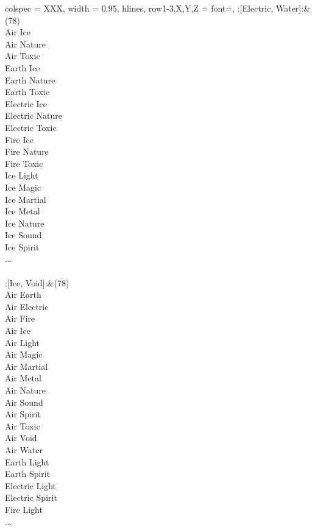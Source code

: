 \begin{longtblr}[
	caption = {2v2 Defending Weak},
	label = {2v2-Defending-Weak},
]{
	colspec = {XXX}, width = 0.95\linewidth,
	hlines,
	row{1-3,X,Y,Z} = {font=\bfseries},
}
	:[Electric, Water]:&{(78)\\
	Air Ice \\
	Air Nature \\
	Air Toxic \\
	Earth Ice \\
	Earth Nature \\
	Earth Toxic \\
	Electric Ice \\
	Electric Nature \\
	Electric Toxic \\
	Fire Ice \\
	Fire Nature \\
	Fire Toxic \\
	Ice Light \\
	Ice Magic \\
	Ice Martial \\
	Ice Metal \\
	Ice Nature \\
	Ice Sound \\
	Ice Spirit \\
	...\\
	}\\

	:[Ice, Void]:&{(78)\\
	Air Earth \\
	Air Electric \\
	Air Fire \\
	Air Ice \\
	Air Light \\
	Air Magic \\
	Air Martial \\
	Air Metal \\
	Air Nature \\
	Air Sound \\
	Air Spirit \\
	Air Toxic \\
	Air Void \\
	Air Water \\
	Earth Light \\
	Earth Spirit \\
	Electric Light \\
	Electric Spirit \\
	Fire Light \\
	...\\
	}\\


\end{longtblr}
